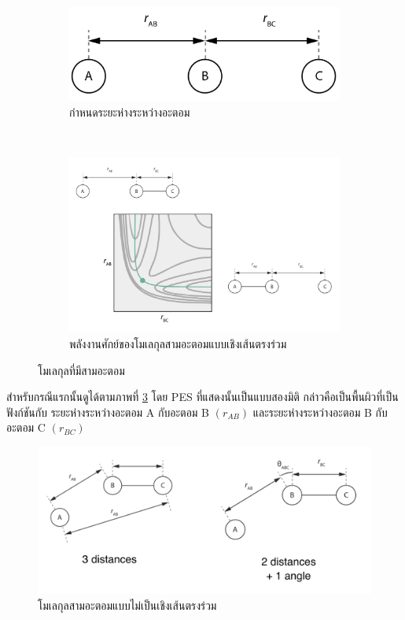 \begin{figure}[htbp]
    \centering
    \begin{subfigure}{0.7\textwidth}
        \centering
        \includegraphics[width=\linewidth]{fig/3-body_collinear.png}
        \caption{กำหนดระยะห่างระหว่างอะตอม}
        \label{fig:3_body_mol}
    \end{subfigure}%
    \\
    \begin{subfigure}{0.9\textwidth}
        \centering
        \includegraphics[width=\linewidth]{fig/3-body_collinear_PES.png}
        \caption{พลังงานศักย์ของโมเลกุลสามอะตอมแบบเชิงเส้นตรงร่วม}
        \label{fig:PES_3_body_mol}
    \end{subfigure}
    \caption{โมเลกุลที่มีสามอะตอม}
    \label{fig:3_body_mol_and_PES}
\end{figure}

สำหรับกรณีแรกนั้นดูได้ตามภาพที่ \ref{fig:3_body_mol_and_PES} โดย PES ที่แสดงนั้นเป็นแบบสองมิติ กล่าวคือเป็นพื้นผิวที่เป็นฟังก์ชันกับ%
ระยะห่างระหว่างอะตอม A กับอะตอม B $(r_{AB})$ และระยะห่างระหว่างอะตอม B กับอะตอม C $(r_{BC})$

\begin{figure}[htbp]
    \centering
    \includegraphics[width=\linewidth]{fig/3-body_non-collinear.png}
    \caption{โมเลกุลสามอะตอมแบบไม่เป็นเชิงเส้นตรงร่วม}
    \label{fig:non_collinear}
\end{figure}

